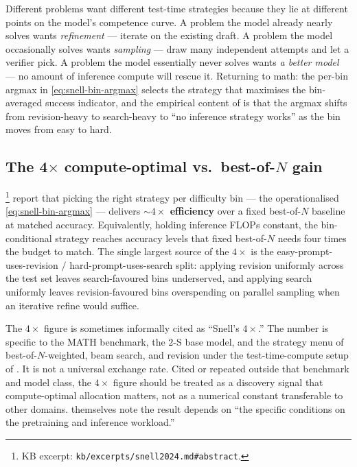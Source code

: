 \begin{intuition}
Different problems want different test-time strategies because they lie
at different points on the model's competence curve. A problem the
model already nearly solves wants \emph{refinement} --- iterate on the
existing draft. A problem the model occasionally solves wants
\emph{sampling} --- draw many independent attempts and let a verifier
pick. A problem the model essentially never solves wants \emph{a
better model} --- no amount of inference compute will rescue it.
Returning to math: the per-bin argmax in \cref{eq:snell-bin-argmax}
selects the strategy that maximises the bin-averaged success indicator,
and the empirical content of \citet[\S 3.2, Fig.~9]{snell2024} is that
the argmax shifts from revision-heavy to search-heavy to
``no inference strategy works'' as the bin moves from easy to hard.
\end{intuition}

\subsection{The 4$\times$ compute-optimal vs.\ best-of-$N$ gain}
\label{sec:snell-4x}

\citet[abstract]{snell2024}%
\footnote{KB excerpt: \nolinkurl{kb/excerpts/snell2024.md#abstract}.}
report that picking the right strategy per difficulty bin --- the
operationalised \cref{eq:snell-bin-argmax} --- delivers
\textbf{$\sim 4\times$ efficiency} over a fixed best-of-$N$ baseline at
matched accuracy. Equivalently, holding inference FLOPs constant, the
bin-conditional strategy reaches accuracy levels that fixed best-of-$N$
needs four times the budget to match. The single largest source of the
$4\times$ is the easy-prompt-uses-revision $/$ hard-prompt-uses-search
split: applying revision uniformly across the test set leaves
search-favoured bins underserved, and applying search uniformly leaves
revision-favoured bins overspending on parallel sampling when an
iterative refine would suffice.

\begin{forumsignal}
The $4\times$ figure is sometimes informally cited as ``Snell's
$4\times$.'' The number is specific to the MATH benchmark, the 
$2$-S\* base model, and the strategy menu of best-of-$N$-weighted, beam
search, and revision under the test-time-compute setup of
\citet[\S 5--6]{snell2024}. It is not a universal exchange rate. Cited
or repeated outside that benchmark and model class, the $4\times$
figure should be treated as a discovery signal that compute-optimal
allocation matters, not as a numerical constant transferable to other
domains. \citet[\S 6]{snell2024} themselves note the result depends on
``the specific conditions on the pretraining and inference workload.''
\end{forumsignal}

